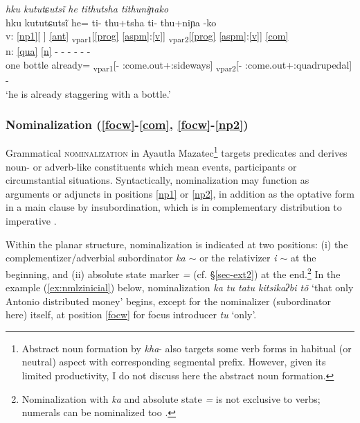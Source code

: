 \documentclass[output=paper]{langscibook}
\begin{document}
\ea \label{ex:parallel}
 \textit{\st{}h\ssn{}ku\2\3 ku\1\ssn{}tu\1tɕu\1\st{}tsĩ\3 he\2 ti\2thu\4\st{}tsha\3 ti\2thu\4ni\2ɲa\2\st{}ko\1\3}\\  %
\gllll {} h\ssn{}ku\2\3 ku\1\ssn{}tu\1tɕu\1tsĩ\3 he\2\ff=  ti\2\ff- thu\4+tsha\3\ff{} ti\2\ff- thu\4+ni\2ɲa\2 -ko\1\3\\
v: \ref{np1}[ ] \ref{ant} \textsubscript{vpar1}[\ref{prog} \ref{aspm}:\ref{v}] \textsubscript{vpar2}[\ref{prog} \ref{aspm}:\ref{v}] \ref{com}\\
n: \ref{qua} \ref{n} - - - - - -\\
{} one bottle already= \textsubscript{vpar1}[\Prog- \Hab:come.out+\Pos:sideways] \textsubscript{vpar2}[\Prog- \Hab:come.out+\Pos:quadrupedal] -\Com\\
\glt `he is already staggering with a bottle.'
\z

\subsubsection{Nominalization (\ref{focw}-\ref{com}, \ref{focw}-\ref{np2})}\label{sec:d:subspan2} 
Grammatical \textsc{nominalization} in Ayautla Mazatec\footnote{Abstract noun formation by \textit{k\lab{}ha\1}- also targets some verb forms in habitual (or neutral) aspect with corresponding segmental prefix. However, given its limited productivity, I do not discuss here the abstract noun formation.} targets predicates and derives noun- or adverb-like constituents which mean events, participants or circumstantial situations. Syntactically, nominalization may function as arguments or adjuncts in positions \ref{np1} or \ref{np2}, in addition as the optative form in a main clause by insubordination, which is in complementary distribution to imperative \citep[cf.][248, 47-50]{nakamoto20}.

Within the planar structure, nominalization is indicated at two positions: (i) the complementizer/adverbial subordinator \textit{\ssn ka\2 $\sim$ \tlg\2} or the relativizer \textit{\xy i\2 $\sim$ \tlg\2} at the beginning, and (ii) absolute state marker \textit{=\1} (cf. \S\ref{sec-ext2}) at the end.\footnote{Nominalization with \textit{\ssn ka\2} and absolute state \textit{=\1} is not exclusive to verbs; numerals can be nominalized too \citep[329--330]{nakamoto20}.} 
In the example (\ref{ex:nmlzinicial}) below, nominalization \textit{\ssn ka\2 tu\1 t\xy a\2\st\ssn tu\4\1 ki\2tsi\2ka\2\st{}ʔbi\3 \st{}tõ\2\4\1} `that only Antonio distributed money' begins, except for the nominalizer (subordinator here) itself, at position \ref{focw} for focus introducer \textit{tu\1} `only'.
\end{document}
